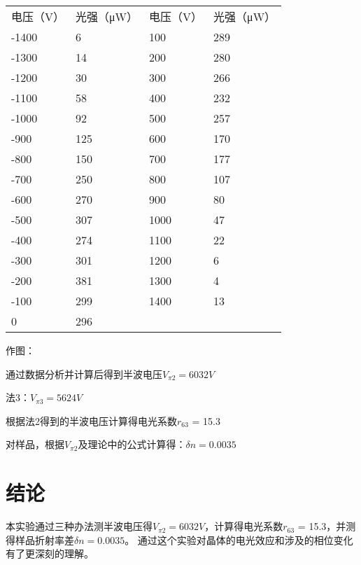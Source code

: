 \documentclass[font=default]{mpltx}
\begin{document}
\begin{table}[]
\begin{tabular}{llll}
电压（V）                      & 光强（μW）                   & 电压（V） & 光强（μW） \\
-1400                      & 6                        & 100   & 289    \\
-1300                      & 14                       & 200   & 280    \\
-1200                      & 30                       & 300   & 266    \\
-1100                      & 58                       & 400   & 232    \\
-1000                      & 92                       & 500   & 257    \\
-900                       & 125                      & 600   & 170    \\ \cline{1-2}
\multicolumn{1}{|l|}{-800} & \multicolumn{1}{l|}{150} & 700   & 177    \\ \cline{1-2}
-700                       & 250                      & 800   & 107    \\
-600                       & 270                      & 900   & 80     \\
-500                       & 307                      & 1000  & 47     \\
-400                       & 274                      & 1100  & 22     \\
-300                       & 301                      & 1200  & 6      \\
-200                       & 381                      & 1300  & 4      \\
-100                       & 299                      & 1400  & 13     \\
0                          & 296                      &       &       
\end{tabular}
\end{table}

作图：

通过数据分析并计算后得到半波电压$V_{\pi2} = 6032V$

法3：$V_{\pi3} = 5624V$

根据法2得到的半波电压计算得电光系数$r_{63}$ = 15.3

对样品，根据$V_{\pi2}$及理论中的公式计算得：$\delta n = 0.0035$


\section{结论}
本实验通过三种办法测半波电压得$V_{\pi2} = 6032V$，计算得电光系数$r_{63}$ = 15.3，并测得样品折射率差$\delta n = 0.0035$。
通过这个实验对晶体的电光效应和涉及的相位变化有了更深刻的理解。
\end{document}
